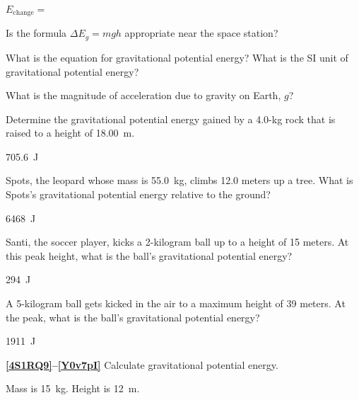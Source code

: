\documentclass[../main-physics-problems.tex]{subfiles}
\begin{document}
\begin{questions}
\begin{parts}
\bigskip

$E_\mathrm{change} = $ \fillin[88.55]

\bigskip

Is the formula $\Delta E_g = mgh$ appropriate near the space station?

\end{parts}

\begin{center}
    
\end{center}

\question \label{xxSTEr}
What is the equation for gravitational potential energy? What is the SI unit of gravitational potential energy?


\question
What is the magnitude of acceleration due to gravity on Earth, $g$?


\question \label{9p9meZ}
Determine the gravitational potential energy gained by a 4.0-kg rock that is raised to a height of \SI{18.00}{m}.

\begin{solution}
\SI{705.6}{J}
\end{solution}


\question \label{i6NTnH}
Spots, the leopard whose mass is \SI{55.0}{kg}, climbs 12.0 meters up a tree. What is Spots's gravitational potential energy relative to the ground?

\begin{solution}
\SI{6468}{J}
\end{solution}

\question \label{FAhPt5}
Santi, the soccer player, kicks a 2-kilogram ball up to a height of 15 meters. At this peak height, what is the ball's gravitational potential energy?

\begin{solution}
\SI{294}{J}
\end{solution}


\question \label{Nn51QC}
A 5-kilogram ball gets kicked in the air to a maximum height of 39 meters. At the peak, what is the ball's gravitational potential energy?

\begin{solution}
\SI{1911}{J}
\end{solution}

\textbf{\ref{4S1RQ9}--\ref{Y0v7pI}} Calculate gravitational potential energy.

\question \label{4S1RQ9}
Mass is \SI{15}{kg}. Height is \SI{12}{m}.


\end{questions}
\end{document}
